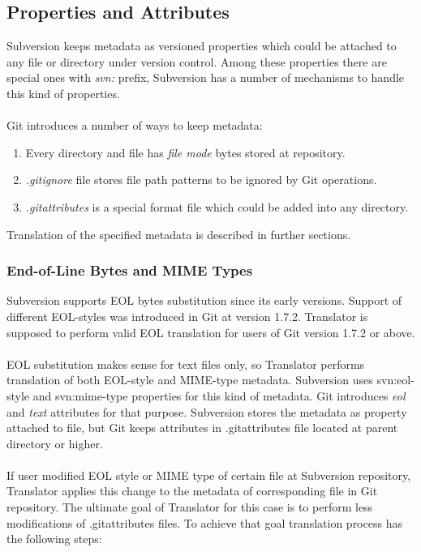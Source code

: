 \subsection{Properties and Attributes}
Subversion keeps metadata as versioned properties which could be attached to any file or directory under version control. Among these properties there are special ones with \emph{svn:} prefix, Subversion has a number of mechanisms to handle this kind of properties.
\\\\
Git introduces a number of ways to keep metadata:
\begin{enumerate}
\compactlist
\item Every directory and file has \emph{file mode} bytes stored at repository.
\item \emph{.gitignore} file stores file path patterns to be ignored by Git operations.
\item \emph{.gitattributes} is a special format file which could be added into any directory.
\end{enumerate}

Translation of the specified metadata is described in further sections.

\subsubsection{End-of-Line Bytes and MIME Types}
Subversion supports EOL bytes substitution since its early versions. Support of different EOL-styles was introduced in Git at version 1.7.2. Translator is supposed to perform valid EOL translation for users of Git version 1.7.2 or above.
\\\\
EOL substitution makes sense for text files only, so Translator performs translation of both EOL-style and MIME-type metadata. Subversion uses svn:eol-style and svn:mime-type properties for this kind of metadata. Git introduces \emph{eol} and \emph{text} attributes for that purpose. Subversion stores the metadata as property attached to file, but Git keeps attributes in .gitattributes file located at parent directory or higher.
\\\\
If user modified EOL style or MIME type of certain file at Subversion repository, Translator applies this change to the metadata of corresponding file in Git repository. The ultimate goal of Translator for this case is to perform less modifications of .gitattributes files. To achieve that goal translation process has the following steps:

